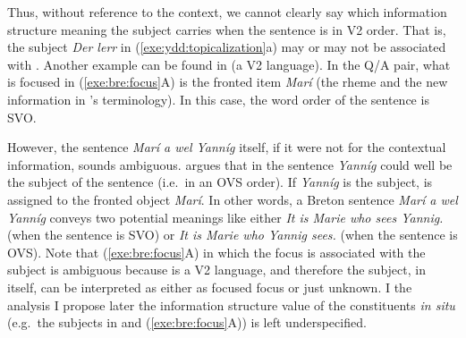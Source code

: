 \noindent Thus, without reference to the context, we cannot clearly
say which information structure meaning the subject carries when the
sentence is in V2 order. That is, the subject \textit{Der
  ler{\textschwa}r} in (\ref{exe:ydd:topicalization}a) may or may not
be associated with .  Another example can be found in
 (a V2 language). In the Q/A pair, what
is focused in (\ref{exe:bre:focus}A) is the fronted item
\textit{Mar\'i} (the rheme and the new information in
\citet{press:86}'s terminology). In this case, the word order of the
sentence is SVO.


\noindent However, the sentence \textit{Mar\'i a wel Yann\'ig} itself,
if it were not for the contextual information, sounds
ambiguous. \citeauthor{press:86} argues that in the sentence
\textit{Yann\'ig} could well be the subject of the sentence (i.e.\ in
an OVS order). If \textit{Yann\'ig} is the subject,  is assigned
to the fronted object \textit{Mar\'i}. In other words, a Breton
sentence \textit{Mar\'i a wel Yann\'ig} conveys two potential meanings
like either \textit{It is Marie who sees Yannig.} (when the sentence
is SVO) or \textit{It is Marie who Yannig sees.} (when the sentence is
OVS).  Note that (\ref{exe:bre:focus}A) in which the focus is
associated with the subject is ambiguous because  is a V2
language, and therefore the subject, in itself, can be interpreted as
either as focused focus or just unknown. I the analysis I propose
later the information structure value of the constituents \textit{in
  situ} (e.g.\ the subjects in  and
(\ref{exe:bre:focus}A)) is left underspecified.


